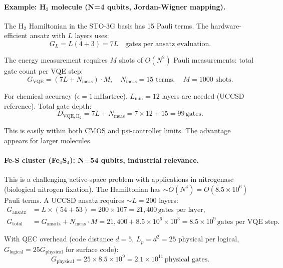 \documentclass[11pt]{article}
\theoremstyle{definition}
\theoremstyle{remark}
\begin{document}
\paragraph{Example: H$_2$ molecule (N=4 qubits, Jordan-Wigner mapping).}
The H$_2$ Hamiltonian in the STO-3G basis has 15 Pauli terms. The
hardware-efficient ansatz with $L$ layers uses:
\begin{equation}
G_L = L(4 + 3) = 7L \quad\text{gates per ansatz evaluation}.
\end{equation}

The energy measurement requires $M$ shots of $O(N^2)$ Pauli measurements:
total gate count per VQE step:
\begin{equation}
G_{\mathrm{VQE}} = (7L + N_{\mathrm{meas}})\cdot M,
\quad N_{\mathrm{meas}} = 15\text{ terms}, \quad M = 1000\text{ shots}.
\end{equation}

For chemical accuracy ($\epsilon = 1\,\mathrm{mHartree}$), $L_{\min} = 12$
layers are needed (UCCSD reference). Total gate depth:
\begin{equation}
D_{\mathrm{VQE,H_2}} = 7L + N_{\mathrm{meas}} = 7\times12 + 15 = 99\,\text{gates}.
\end{equation}

This is easily within both CMOS and psi-controller limits. The advantage
appears for larger molecules.

\paragraph{Fe-S cluster (Fe$_4$S$_4$): N=54 qubits, industrial relevance.}
This is a challenging active-space problem with applications in nitrogenase
(biological nitrogen fixation). The Hamiltonian has $\sim O(N^4) = O(8.5\times10^6)$
Pauli terms. A UCCSD ansatz requires $\sim L = 200$ layers:
\begin{align}
G_{\mathrm{ansatz}} &= L\times(54 + 53) = 200\times107 = 21{,}400\,\text{gates per layer}, \\
G_{\mathrm{total}} &= G_{\mathrm{ansatz}} + N_{\mathrm{meas}}\cdot M
= 21{,}400 + 8.5\times10^6\times10^3
= 8.5\times10^9\,\text{gates per VQE step}.
\end{align}

With QEC overhead (code distance $d=5$, $L_p = d^2 = 25$ physical per
logical, $G_{\mathrm{logical}} = 25G_{\mathrm{physical}}$ for surface code):
\begin{equation}
G_{\mathrm{physical}} = 25\times8.5\times10^9 = 2.1\times10^{11}\,\text{physical gates}.
\end{equation}
\end{document}
